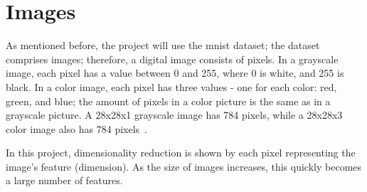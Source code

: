 \section{Images}\label{sec:images}
As mentioned before, the project will use the \gls{mnist} dataset; the dataset comprises images; therefore, a digital image consists of pixels. In a grayscale image, each pixel has a value between 0 and 255, where 0 is white, and 255 is black. In a color image, each pixel has three values - one for each color: red, green, and blue; the amount of pixels in a color picture is the same as in a grayscale picture. A 28x28x1 grayscale image has 784 pixels, while a 28x28x3 color image also has 784 pixels~\cite{picture}.

In this project, dimensionality reduction is shown by each pixel representing the image's feature (dimension). As the size of images increases, this quickly becomes a large number of features.